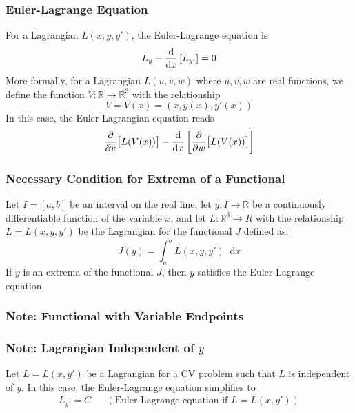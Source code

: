 \documentclass[11pt, a4paper]{article}
\newcommand{\diff}{\mathop{}\!\mathrm{d}} %
\newcommand{\R}{\mathbb{R}} %
\begin{document}
\subsubsection{Euler-Lagrange Equation}
For a Lagrangian $ L(x, y, y') $, the Euler-Lagrange equation is
\begin{equation*}
	L_{y} - \dv{}{x} \left[L_{y'}\right] = 0
\end{equation*}
More formally, for a Lagrangian $ L(u, v, w) $ where $ u, v, w $ are real functions, we define the function $ V : \R \to \R^3 $ with the relationship
\begin{equation*}
	V = V(x) = (x, y(x), y'(x))
\end{equation*}
In this case, the Euler-Lagrangian equation reads
\begin{equation*}
	\pdv{}{v} \big [L(V(x)) \big ] - \dv{}{x} \left[\pdv{}{w}\big[L(V(x)) \big ] \right]
\end{equation*}

\subsubsection{Necessary Condition for Extrema of a Functional}
Let $ I = [a, b] $ be an interval on the real line, let $ y: I \to \R $ be a continuously differentiable function of the variable $ x $, and let $ L : \R^3 \to R $ with the relationship $ L = L(x, y, y') $ be the Lagrangian for the functional $ J $ defined as:
\begin{equation*}
	J(y) = \int_{a}^{b} L(x, y, y') \diff x
\end{equation*}
If $ y $ is an extrema of the functional $ J $, then $ y $ satisfies the Euler-Lagrange equation.

\subsubsection{Note: Functional with Variable Endpoints}

\subsubsection{Note: Lagrangian Independent of $ y $}
Let $ L = L(x, y') $ be a Lagrangian for a CV problem such that $ L $ is independent of $ y $. In this case, the Euler-Lagrange equation simplifies to
\begin{align*}
	L_{y'} = C && (\text{Euler-Lagrange equation if } L = L(x, y'))
\end{align*}
\end{document}
